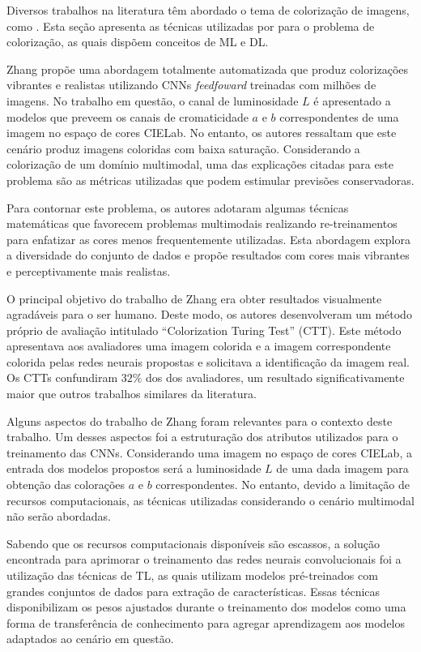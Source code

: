 Diversos trabalhos na literatura têm abordado o tema de colorização de imagens, como \cite{ref:rel-zhang} . Esta seção apresenta as técnicas utilizadas por \cite{ref:rel-zhang} para o problema de colorização, as quais dispõem conceitos de ML e DL.

Zhang propõe uma abordagem totalmente automatizada que produz colorizações vibrantes e realistas utilizando CNNs \emph{feedfoward} treinadas com milhões de imagens. No trabalho em questão, o canal de luminosidade $L$ é apresentado a modelos que preveem os canais de cromaticidade $a$ e $b$ correspondentes de uma imagem no espaço de cores CIELab. No entanto, os autores ressaltam que este cenário produz imagens coloridas com baixa saturação. Considerando a colorização de um domínio multimodal, uma das explicações citadas para este problema são as métricas utilizadas que podem estimular previsões conservadoras.
 
Para contornar este problema, os autores adotaram algumas técnicas matemáticas que favorecem problemas multimodais realizando re-treinamentos para enfatizar as cores menos frequentemente utilizadas. Esta abordagem explora a diversidade do conjunto de dados e propõe resultados com cores mais vibrantes e perceptivamente mais realistas.

O principal objetivo do trabalho de Zhang era obter resultados visualmente agradáveis para o ser humano. Deste modo, os autores desenvolveram um método próprio de avaliação intitulado ``Colorization Turing Test'' (CTT). Este método apresentava aos avaliadores uma imagem colorida e a imagem correspondente colorida pelas redes neurais propostas e solicitava a identificação da imagem real. Os CTTs confundiram $32\%$ dos dos avaliadores, um resultado significativamente maior que outros trabalhos similares da literatura.

Alguns aspectos do trabalho de Zhang foram relevantes para o contexto deste trabalho. Um desses aspectos foi a estruturação dos atributos utilizados para o treinamento das CNNs. Considerando uma imagem no espaço de cores CIELab, a entrada dos modelos propostos será a luminosidade $L$ de uma dada imagem para obtenção das colorações $a$ e $b$ correspondentes. No entanto, devido a limitação de recursos computacionais, as técnicas utilizadas considerando o cenário multimodal não serão abordadas.

Sabendo que os recursos computacionais disponíveis são escassos, a solução encontrada para aprimorar o treinamento das redes neurais convolucionais foi a utilização das técnicas de TL, as quais utilizam modelos pré-treinados com grandes conjuntos de dados para extração de características. Essas técnicas disponibilizam os pesos ajustados durante o treinamento dos modelos como uma forma de transferência de conhecimento para agregar aprendizagem aos modelos adaptados ao cenário em questão.  
